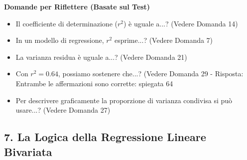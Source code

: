 \documentclass[12pt, a4paper]{article}
\newenvironment{reflectionbox}{%
    \medskip
    \begin{framed}\par\noindent
    \textbf{\color{boxtitlecolor}Domande per Riflettere (Basate sul Test)} \par
    \begin{itemize}[leftmargin=*, label=$\blacktriangleright$]
}{%
    \end{itemize}\par
    \end{framed}
    \medskip
}
\newcommand{\rsq}{r^2} %
\begin{document}
\begin{reflectionbox}
    \item Il coefficiente di determinazione ($\rsq$) è uguale a...? (Vedere Domanda 14)
    \item In un modello di regressione, $\rsq$ esprime...? (Vedere Domanda 7)
    \item La varianza residua è uguale a...? (Vedere Domanda 21)
    \item Con $\rsq = 0.64$, possiamo sostenere che...? (Vedere Domanda 29 - Risposta: Entrambe le affermazioni sono corrette: spiegata 64%
    \item Per descrivere graficamente la proporzione di varianza condivisa si può usare...? (Vedere Domanda 27)
\end{reflectionbox}

\subsection*{7. La Logica della Regressione Lineare Bivariata}
\end{document}
